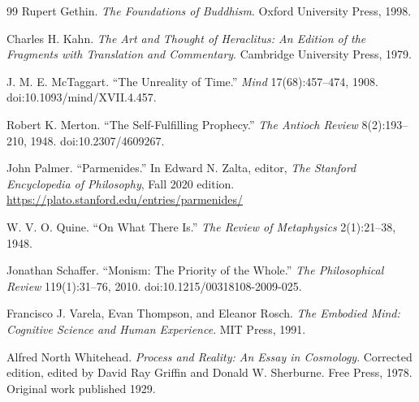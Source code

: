 \documentclass[11pt]{article}
\begin{document}
\begin{thebibliography}{99}
Rupert Gethin.
\newblock \emph{The Foundations of Buddhism}.
\newblock Oxford University Press, 1998.

Charles H. Kahn.
\newblock \emph{The Art and Thought of Heraclitus: An Edition of the Fragments with Translation and Commentary}.
\newblock Cambridge University Press, 1979.

J. M. E. McTaggart.
\newblock ``The Unreality of Time.''
\newblock \emph{Mind} 17(68):457--474, 1908.
\newblock doi:10.1093/mind/XVII.4.457.

Robert K. Merton.
\newblock ``The Self-Fulfilling Prophecy.''
\newblock \emph{The Antioch Review} 8(2):193--210, 1948.
\newblock doi:10.2307/4609267.

John Palmer.
\newblock ``Parmenides.''
\newblock In Edward N. Zalta, editor, \emph{The Stanford Encyclopedia of Philosophy}, Fall 2020 edition.
\newblock \url{https://plato.stanford.edu/entries/parmenides/}

W. V. O. Quine.
\newblock ``On What There Is.''
\newblock \emph{The Review of Metaphysics} 2(1):21--38, 1948.

Jonathan Schaffer.
\newblock ``Monism: The Priority of the Whole.''
\newblock \emph{The Philosophical Review} 119(1):31--76, 2010.
\newblock doi:10.1215/00318108-2009-025.

Francisco J. Varela, Evan Thompson, and Eleanor Rosch.
\newblock \emph{The Embodied Mind: Cognitive Science and Human Experience}.
\newblock MIT Press, 1991.

Alfred North Whitehead.
\newblock \emph{Process and Reality: An Essay in Cosmology}. Corrected edition, edited by David Ray Griffin and Donald W. Sherburne.
\newblock Free Press, 1978. Original work published 1929.

\end{thebibliography}
\end{document}
